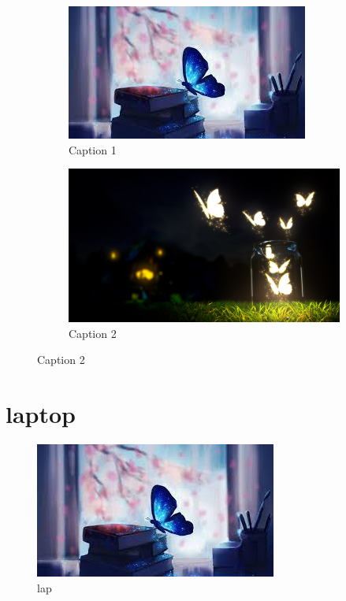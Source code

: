 \documentclass{article}
\begin{document}
	\begin{figure}[h]
		\centering
	   \begin{subfigure}{0.45\textwidth}
	   	\centering
	   	\includegraphics[width=1.0\linewidth]{click.jpg}
	   	\caption{Caption 1}
	   \end{subfigure}
	   \hfill
	   \begin{subfigure}{0.45\textwidth}
	   	\includegraphics[width=1.0\linewidth]{b.jpg}
	   	\caption{Caption 2}
	   \end{subfigure}
	\end{figure}
	\section{laptop}
	\begin{figure}
	\includegraphics[width=0.5\linewidth]{click.jpg}
	\caption{lap }
	\label{fig:wrapfig}
	\end{figure} 
	
  	 	
	 
	
\end{document}
